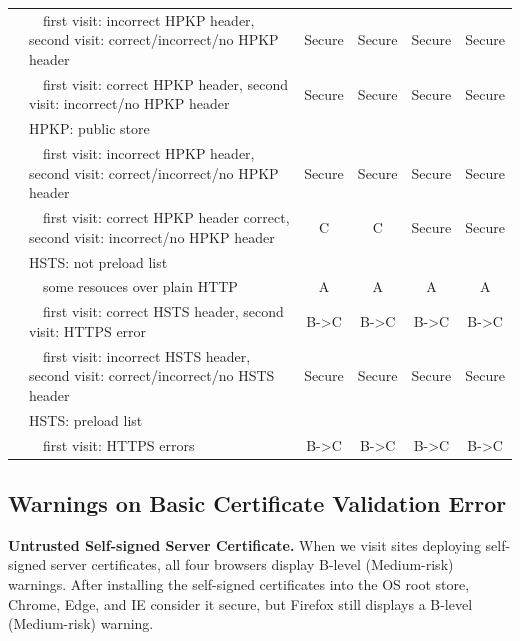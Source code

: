 \begin{table}[htbp]
\begin{tabular}{p{2.2cm}|l|cccc}
 & ~~first visit: incorrect HPKP header, second visit: correct/incorrect/no HPKP header & Secure & Secure & Secure & Secure \\
 & ~~first visit: correct HPKP header, second visit: incorrect/no HPKP header & Secure & Secure & Secure & Secure \\
 & HPKP: public store &  &  &  &  \\
 & ~~first visit: incorrect HPKP header, second visit: correct/incorrect/no HPKP header & Secure & Secure & Secure & Secure \\
 & ~~first visit: correct HPKP header correct, second visit: incorrect/no HPKP header & C & C & Secure & Secure \\ \cline{2-6}
 & HSTS: not preload list &  &  &  &  \\
 & ~~some resouces over plain HTTP & A & A & A & A \\
 & ~~first visit: correct HSTS header, second visit: HTTPS error & B-\textgreater{}C & B-\textgreater{}C & B-\textgreater{}C & B-\textgreater{}C \\
 & ~~first visit: incorrect HSTS header, second visit: correct/incorrect/no HSTS header & Secure & Secure & Secure & Secure \\
 & HSTS: preload list &  &  &  &  \\
 & ~~first visit: HTTPS errors & B-\textgreater{}C & B-\textgreater{}C & B-\textgreater{}C & B-\textgreater{}C \\ \bottomrule
\end{tabular}
\end{table}%



\subsection{Warnings on Basic Certificate Validation Error}

\textbf{Untrusted Self-signed Server Certificate.}
    When we visit sites deploying self-signed server certificates, all four browsers display B-level (Medium-risk) warnings.
    After installing the self-signed certificates into the OS root store, Chrome, Edge, and IE consider it secure, but Firefox still displays a B-level (Medium-risk) warning.


